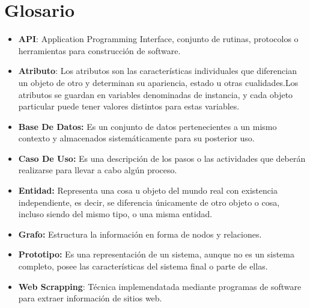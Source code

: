 \newpage
\section*{Glosario}
\begin{itemize}
  \item \textbf{API}: Application Programming Interface, conjunto de rutinas, protocolos o herramientas para construcción de software.
  \item \textbf{Atributo}: Los atributos son las características individuales que diferencian un objeto de otro y determinan su apariencia, estado u otras cualidades.Los atributos se guardan en variables denominadas de instancia, y cada objeto particular puede tener valores distintos para estas variables.
  \item \textbf{Base De Datos:} Es un conjunto de datos pertenecientes a un mismo contexto y almacenados sistemáticamente para su posterior uso.
  \item  \textbf{Caso De Uso:} Es una descripción de los pasos o las actividades que deberán realizarse para llevar a cabo algún proceso. 
  \item \textbf{Entidad:} Representa una cosa u objeto del mundo real con existencia independiente, es decir, se diferencia únicamente de otro objeto o cosa, incluso siendo del mismo tipo, o una misma entidad.
   \item \textbf{Grafo:} Estructura la información en forma de nodos y relaciones.
   \item \textbf{Prototipo:} Es una representación de un sistema, aunque no es un sistema completo, posee las características del sistema final o parte de ellas.
   \item \textbf{Web Scrapping}:  Técnica implemendatada mediante programas de software para extraer información de sitios web.
\end{itemize}
